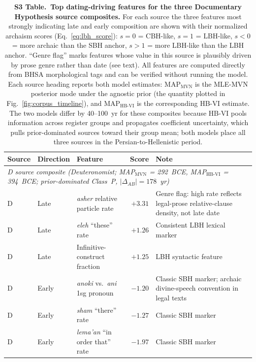 \documentclass[10pt,letterpaper]{article}
\newcommand{\mvn}{MLE-MVN}
\newcommand{\hbvi}{HB-VI}
\begin{document}
\begin{table}[!ht]
\caption{\textbf{S3 Table.\ Top dating-driving features for the three Documentary Hypothesis source
composites.}
For each source the three features most strongly indicating late and early composition are shown
with their normalized archaism scores (Eq.~\ref{eq:lbh_score}): $s=0$ = CBH-like, $s=1$ =
LBH-like, $s<0$ = more archaic than the SBH anchor, $s>1$ = more LBH-like than the LBH
anchor.  ``Genre flag'' marks features whose value in this source is plausibly driven by prose
genre rather than date (see text).  All features are computed directly from BHSA morphological
tags and can be verified without running the model.  Each source heading reports both model
estimates: MAP$_{\text{MVN}}$ is the \mvn{} posterior mode under the agnostic prior (the
quantity plotted in Fig.~\ref{fig:corpus_timeline}), and MAP$_{\text{HB-VI}}$ is the
corresponding \hbvi{} estimate.  The two models differ by 40--100~yr for these composites
because \hbvi{} pools information across register groups and propagates coefficient
uncertainty, which pulls prior-dominated sources toward their group mean; both models place
all three sources in the Persian-to-Hellenistic period.}
\label{tab:s3_features}
\setlength{\tabcolsep}{4pt}
\begin{tabular}{llp{4.9cm}rp{5.1cm}}
\hline
\textbf{Source} & \textbf{Direction} & \textbf{Feature} & \textbf{Score} & \textbf{Note} \\
\hline
\multicolumn{5}{p{15cm}}{\textit{D source composite (Deuteronomist; MAP$_{\text{MVN}}$ = 292~BCE, MAP$_{\text{HB-VI}}$ = 394~BCE; prior-dominated Class~P, $|\Delta_{AB}|=178$~yr)}} \\
D & Late & \textit{asher} relative particle rate & $+3.31$ & Genre flag: high rate reflects legal-prose relative-clause density, not late date \\
D & Late & \textit{eleh} ``these'' rate         & $+1.26$ & Consistent LBH lexical marker \\
D & Late & Infinitive-construct fraction             & $+1.25$ & LBH syntactic feature \\
D & Early & \textit{anoki} vs.\ \textit{ani} 1sg pronoun & $-1.20$ & Classic SBH marker; archaic divine-speech convention in legal texts \\
D & Early & \textit{sham} ``there'' rate          & $-1.27$ & Classic SBH marker \\
D & Early & \textit{lema'an} ``in order that'' rate & $-1.97$ & Classic SBH marker \\

\end{tabular}
\end{table}
\end{document}
